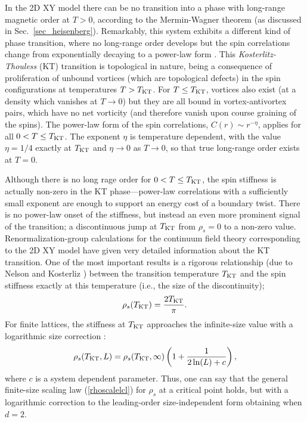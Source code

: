 \documentclass[draft,numberedheadings]{aipproc}
\begin{document}
In the 2D XY model there can be no transition into a phase with long-range magnetic order at $T>0$, according to the Mermin-Wagner theorem
\cite{mermin} (as discussed in Sec.~\ref{sec_heisenberg}). Remarkably, this system exhibits a different kind of phase transition, where
no long-range order develops but the spin correlations change from exponentially decaying to a power-law form \cite{kosterlitz73,kosterlitz74}. 
This {\it Kosterlitz-Thouless} (KT) transition is topological in nature, being a consequence of proliferation of unbound vortices (which are 
topological defects) in the spin configurations at temperatures $T>T_{\rm KT}$. For $T \le T_{\rm KT}$, vortices also exist (at a density which
vanishes at $T \to 0$) but they are all bound in vortex-antivortex pairs, which have no net vorticity (and therefore vanish upon course graining
of the spins). The power-law form of the spin correlations, $C(r) \sim r^{-\eta}$, applies for all $0 < T\le T_{\rm KT}$. The exponent $\eta$ is 
temperature dependent, with the value $\eta=1/4$ exactly at $T_{\rm KT}$ and $\eta \to 0$ as $T \to 0$, so that true long-range order exists at $T=0$.

Although there is no long rage order for $0 < T\le T_{\rm KT}$, the spin stiffness is actually non-zero in the KT phase---power-law correlations
with a sufficiently small exponent are enough to support an energy cost of a boundary twist. There is no power-law onset of the stiffness, but 
instead an even more prominent signal of the transition; a discontinuous jump at $T_{\rm KT}$ from $\rho_s=0$ to a non-zero value. 
Renormalization-group calculations for the continuum field theory corresponding to the 2D XY model have given very detailed information about 
the KT transition. One of the most important results is a rigorous relationship (due to Nelson and Kosterliz \cite{nelson77}) between the 
transition temperature $T_{\rm KT}$ and the spin stiffness exactly at this temperature (i.e., the size of the discontinuity);
\begin{equation}
\rho_s(T_{\rm KT}) = \frac{2T_{\rm KT}}{\pi}.
\label{rhosktrel}
\end{equation}
For finite lattices, the stiffness at $T_{\rm KT}$ approaches the infinite-size value with a logarithmic size correction \cite{weber87}:
\begin{equation}
\rho_s(T_{\rm KT},L) = \rho_s(T_{\rm KT},\infty)\left ( 1 + \frac{1}{2\ln(L) + c} \right ),
\label{rhoslogcorr}
\end{equation}
where $c$ is a system dependent parameter. Thus, one can say that the general finite-size scaling law (\ref{rhoscalelcl}) for $\rho_s$ at a critical 
point holds, but with a logarithmic correction to the leading-order size-independent form obtaining when $d=2$. 
\end{document}
